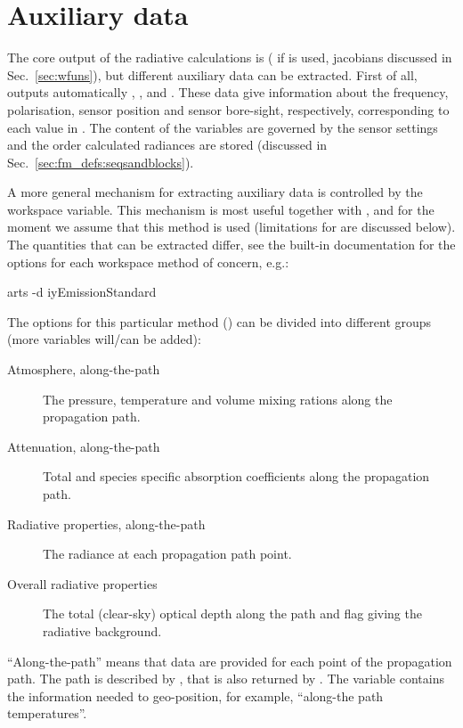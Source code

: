 \section{Auxiliary data}
\label{sec:fm_defs:aux}

The core output of the radiative calculations is 
( if  is used, jacobians discussed in
Sec.~\ref{sec:wfuns}), but different auxiliary data can be extracted. First of
all,  outputs automatically , ,
 and . These data give information about the
frequency, polarisation, sensor position and sensor bore-sight, respectively,
corresponding to each value in . The content of the variables are
governed by the sensor settings and the order calculated radiances are stored
(discussed in Sec.~\ref{sec:fm_defs:seqsandblocks}).

A more general mechanism for extracting auxiliary data is controlled by the
 workspace variable. This mechanism is most useful
together with , and for the moment we assume that this
method is used (limitations for  are discussed below). The
quantities that can be extracted differ, see the built-in documentation for
the options for each workspace method of concern, e.g.:
\begin{code}
arts -d iyEmissionStandard
\end{code}
The options for this particular method  () can be
divided into different groups (more variables will/can be added):
\begin{description}
\item[Atmosphere, along-the-path] The pressure, temperature and volume mixing
  rations along the propagation path.
\item[Attenuation, along-the-path] Total and species specific absorption
  coefficients along the propagation path.
\item[Radiative properties, along-the-path] The radiance at each propagation
  path point.
\item[Overall radiative properties] The total (clear-sky) optical depth along
  the path and flag giving the radiative background.
\end{description}
``Along-the-path'' means that data are provided for each point of the
propagation path. The path is described by , that is also
returned by . The  variable
contains the information needed to geo-position, for example, ``along-the path
temperatures''. 

